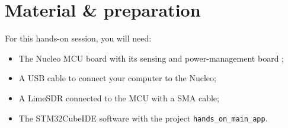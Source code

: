 \section*{Material \& preparation}

For this hands-on session, you will need:
\begin{itemize}
    \item The Nucleo MCU board with its sensing and power-management board ;
    \item A USB cable to connect your computer to the Nucleo;
    \item A LimeSDR connected to the MCU with a SMA cable;
    \item The STM32CubeIDE software with the project \texttt{hands\_on\_main\_app}.
\end{itemize}
